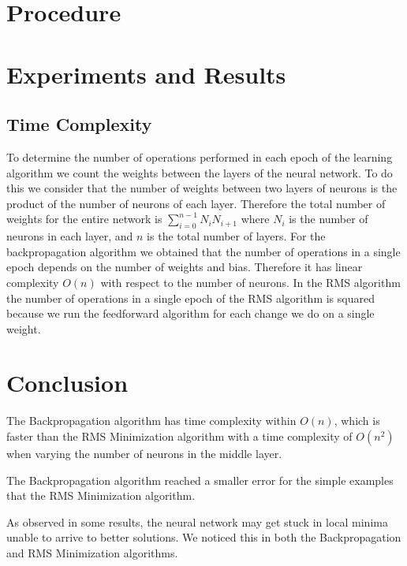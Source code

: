 \documentclass[11pt]{article}
\begin{document}

\section{Procedure} %
\label{sec:procedure}



\section{Experiments and Results} %
\label{sec:results}

\subsection{Time Complexity} %
\label{sub:time_complexity}

To determine the number of operations performed in each epoch of the learning algorithm we count the weights between the layers of the
neural network. To do this we consider that the number of weights between two layers of neurons is the product of the number of neurons
of each layer. Therefore the total number of weights for the entire network is $\sum_{i=0}^{n-1}N_{i}N_{i+1}$ where $N_{i}$ is the
number of neurons in each layer, and $n$ is the total number of layers. For the backpropagation algorithm we obtained that the number
of operations in a single epoch depends on the number of weights and bias. Therefore it has linear complexity $O(n)$ with respect to
the number of neurons. In the RMS algorithm the number of operations in a single epoch of the RMS algorithm is squared because we run
the feedforward algorithm for each change we do on a single weight.



\section{Conclusion} %
\label{sec:conclusion}

The Backpropagation algorithm has time complexity within $O(n)$, which is faster than the RMS Minimization algorithm with a time
complexity of $O(n^{2})$ when varying the number of neurons in the middle layer. 

The Backpropagation algorithm reached a smaller error for the simple examples that the RMS Minimization algorithm.

As observed in some results, the neural network may get stuck in local minima unable to arrive to better solutions. We noticed this in
both the Backpropagation and RMS Minimization algorithms.

    


\end{document}
